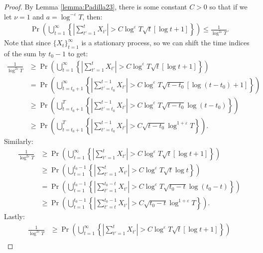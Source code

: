 \begin{proof}
By Lemma \ref{lemma:Padilla23}, there is some constant $C > 0$ so that if we let $\nu = 1$ and $a = \log^{-\varepsilon} T$, then:
\begin{align*}
    \Pr \left(\bigcup_{t=1}^\infty\left\{\left|\sum_{t'=1}^t X_{t'}\right| > C\log^{\varepsilon}T\sqrt{t}\left[\log t + 1\right]\right\}\right) 
    \leq \frac{1}{\log^{2\varepsilon} T}.
\end{align*}
Note that since $\{X_t\}_{t=1}^\infty$ is a stationary process, so we can shift the time indices of the sum by $t_0-1$ to get:
\small
\begin{align*}
    \frac{1}{\log^{2\varepsilon} T} &\geq \Pr \left(\bigcup_{t=1}^\infty\left\{\left|\sum_{t'=1}^t X_{t'}\right| > C\log^{\varepsilon}T\sqrt{t}\left[\log t + 1\right]\right\}\right) \\
    &= \Pr \left(\bigcup_{t=t_0+1}^\infty\left\{\left|\sum_{t'=t_0}^{t-1} X_{t'}\right| > C \log^{\varepsilon}T\sqrt{t-t_0}\left[\log (t-t_0) + 1\right]\right\}\right) \tag{stationarity} \\
    &\geq \Pr \left(\bigcup_{t=t_0+1}^{T}\left\{\left|\sum_{t'=t_0}^{t-1} X_{t'}\right| > C \log^{\varepsilon}T\sqrt{t-t_0}\log (t-t_0)\right\}\right)\\
    &\geq \Pr \left(\bigcup_{t=t_0+1}^{T}\left\{\left|\sum_{t'=t_0}^{t-1} X_{t'}\right| > C \sqrt{t-t_0}\log^{1+\varepsilon}T\right\}\right). \tag{$T > t-t_0$}
\end{align*}
\normalsize
Similarly:
\small
\begin{align*}
    \frac{1}{\log^{2\varepsilon} T} &\geq \Pr \left(\bigcup_{t=1}^\infty\left\{\left|\sum_{t'=1}^t X_{t'}\right| > C\log^{\varepsilon}T\sqrt{t} \left[\log t + 1\right]\right\}\right) \\
    &\geq \Pr \left(\bigcup_{t=1}^{t_0-1}\left\{\left|\sum_{t'=1}^t X_{t'}\right| > C\log^{\varepsilon}T\sqrt{t}\log t\right\}\right) \\
    &= \Pr \left(\bigcup_{t=1}^{t_0-1}\left\{\left|\sum_{t'=1}^{t_0 - t} X_{t'}\right| > C\log^{\varepsilon}T\sqrt{t_0- t}\log (t_0 - t)\right\}\right)  \\
    &\geq \Pr \left(\bigcup_{t=1}^{t_0-1}\left\{\left|\sum_{t'=t}^{t_0-1} X_{t'}\right| > C\sqrt{t_0-t}\log^{1+\varepsilon} T\right\}\right). \tag{$T > t_0-t$}
\end{align*}
\normalsize
Lastly:
\small
\begin{align*}
     \frac{1}{\log^{2\varepsilon} T} &\geq \Pr \left(\bigcup_{t=1}^\infty\left\{\left|\sum_{t'=1}^t X_{t'}\right| > C\log^{\varepsilon}T\sqrt{t} \left[\log t + 1\right]\right\}\right) \\

\end{align*}
\end{proof}
